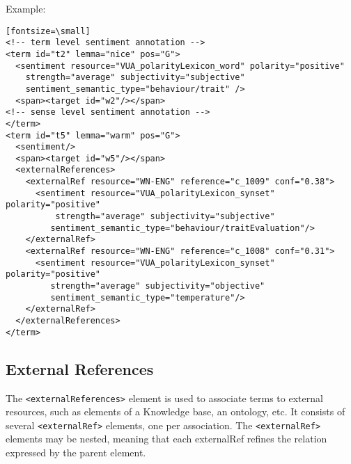 Example:
\begin{verbatim}[fontsize=\small]
<!-- term level sentiment annotation -->
<term id="t2" lemma="nice" pos="G">
  <sentiment resource="VUA_polarityLexicon_word" polarity="positive"
    strength="average" subjectivity="subjective"
    sentiment_semantic_type="behaviour/trait" />
  <span><target id="w2"/></span>
<!-- sense level sentiment annotation -->
</term>
<term id="t5" lemma="warm" pos="G">
  <sentiment/>
  <span><target id="w5"/></span>
  <externalReferences>
    <externalRef resource="WN-ENG" reference="c_1009" conf="0.38">
      <sentiment resource="VUA_polarityLexicon_synset" polarity="positive"
          strength="average" subjectivity="subjective"
         sentiment_semantic_type="behaviour/traitEvaluation"/>
    </externalRef>
    <externalRef resource="WN-ENG" reference="c_1008" conf="0.31">
      <sentiment resource="VUA_polarityLexicon_synset" polarity="positive"
         strength="average" subjectivity="objective"
         sentiment_semantic_type="temperature"/>
    </externalRef>
  </externalReferences>
</term>
\end{verbatim}

\subsection{External References}
\label{sec:external-references}

The \texttt{<externalReferences>} element is used to associate terms to
external resources, such as elements of a Knowledge base, an ontology,
etc. It consists of several \texttt{<externalRef>} elements, one per
association. The \texttt{<externalRef>} elements may be nested, meaning that
each externalRef refines the relation expressed by the parent element.\\

